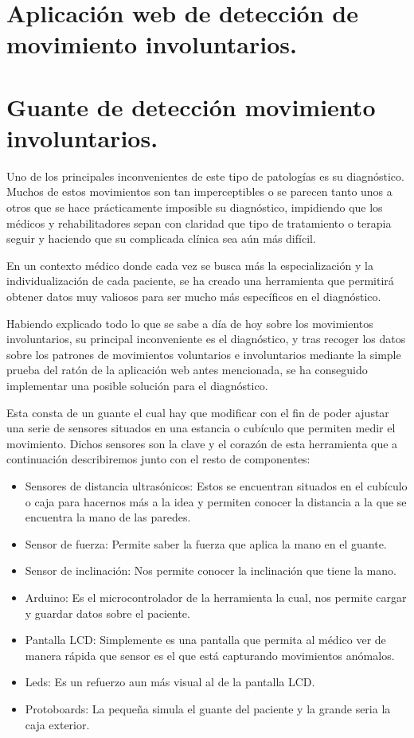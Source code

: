 
\section{Aplicación web de detección de movimiento involuntarios.}

\section{Guante de detección movimiento involuntarios.}
Uno de los principales inconvenientes de este tipo de patologías es su diagnóstico.
Muchos de estos movimientos son tan imperceptibles o se parecen tanto unos a otros que se hace prácticamente imposible su diagnóstico, impidiendo que los médicos y rehabilitadores sepan con claridad que tipo de tratamiento o terapia seguir y haciendo que su complicada clínica sea aún más difícil.

En un contexto médico donde cada vez se busca más la especialización y la individualización de cada paciente, se ha creado una herramienta que  permitirá obtener datos muy valiosos para ser mucho más específicos en el diagnóstico.

Habiendo explicado todo lo que se sabe a día de hoy sobre los movimientos involuntarios, su principal inconveniente es el diagnóstico, y tras recoger los datos sobre los patrones de movimientos voluntarios e involuntarios mediante la simple prueba del ratón de la aplicación web antes mencionada, se ha conseguido implementar una posible solución para el diagnóstico.

Esta consta de un guante el cual hay que modificar con el fin de poder ajustar una serie de sensores situados en una estancia o cubículo que permiten medir el movimiento. Dichos sensores son la clave y el corazón de esta herramienta que a continuación describiremos junto con el resto de componentes:

\begin{itemize}
    \item Sensores de distancia ultrasónicos: Estos se encuentran situados en el cubículo o caja para hacernos más a la idea y permiten conocer la distancia a la que se encuentra la mano de las paredes.
    \item Sensor de fuerza: Permite saber la fuerza que aplica la mano en el guante.
    \item Sensor de inclinación: Nos permite conocer la inclinación que tiene la mano.
    \item Arduino: Es el microcontrolador de la herramienta la cual, nos permite cargar y guardar datos sobre el paciente.
    \item Pantalla LCD: Simplemente es una pantalla que permita al médico ver de manera rápida que sensor es el que está capturando movimientos anómalos.
    \item Leds: Es un refuerzo aun más visual al de la pantalla LCD. 
    \item Protoboards: La pequeña simula el guante del paciente y la grande seria la caja exterior.
\end{itemize}

